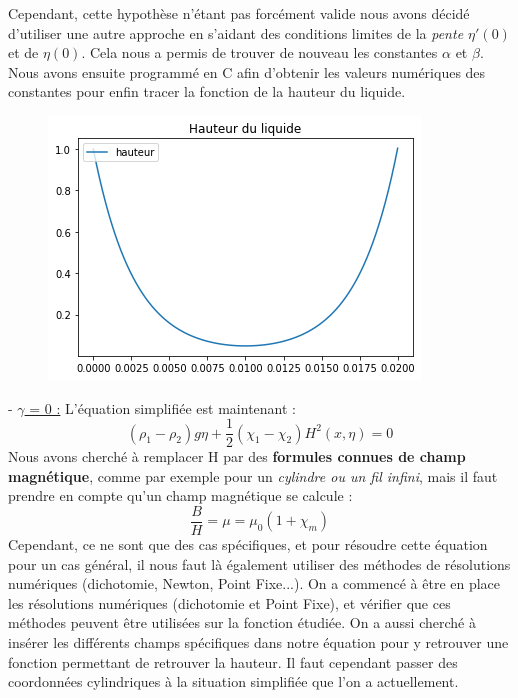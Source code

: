 \documentclass{article}
\begin{document}
Cependant, cette hypothèse n'étant pas forcément valide nous avons décidé d'utiliser une autre approche en s'aidant des conditions limites de la \textit{pente $\eta\prime(0)$}  et de $\eta(0)$. Cela nous a permis de trouver de nouveau  les constantes $\alpha$ et $\beta$. 
\newline
Nous avons ensuite programmé en C afin d'obtenir les valeurs numériques des constantes pour enfin tracer la fonction de la hauteur du liquide.
\begin{figure}[h]
	\centering
    \includegraphics[width=.5\linewidth]{hauteur_fluide_eau.png}
    
\end{figure}
\newline\newline
- \underline{$\gamma$ = 0 :} L'équation simplifiée est maintenant :
\begin{equation}
(\rho_{1} - \rho_{2})g\eta + \frac{1}{2}(\chi_{1} - \chi_{2})H^{2}(x,\eta)=0
\label{eq06}
\end{equation}
Nous avons cherché à remplacer H par des \textbf{formules connues de champ magnétique}, comme par exemple pour un \textit{cylindre ou un fil infini}, mais il faut prendre en compte qu'un champ magnétique se calcule : 
\begin{equation}
\frac{B}{H} = \mu = \mu_{0}(1+ \chi_{m})
\label{eq07}
\end{equation}
Cependant, ce ne sont que des cas spécifiques, et pour résoudre cette équation pour un cas général, il nous faut là également utiliser des méthodes de résolutions numériques (dichotomie, Newton, Point Fixe...).
\newline
On a commencé à être en place les résolutions numériques (dichotomie et Point Fixe), et vérifier que ces méthodes peuvent être utilisées sur la fonction étudiée. On a aussi cherché à insérer les différents champs spécifiques dans notre équation pour y retrouver une fonction permettant de retrouver la hauteur. Il faut cependant passer des coordonnées cylindriques à la situation simplifiée que l'on a actuellement.
\end{document}
